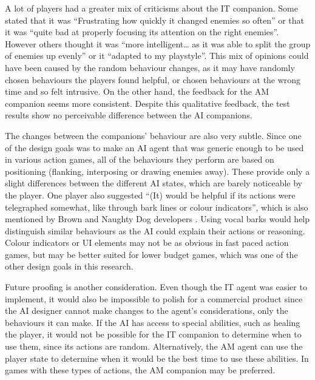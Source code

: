 \documentclass{IEEEtran}
\begin{document}
A lot of players had a greater mix of criticisms about the IT companion. Some stated that it was “Frustrating how quickly it changed enemies so often” or that it was “quite bad at properly focusing its attention on the right enemies”. However others thought it was “more intelligent… as it was able to split the group of enemies up evenly” or it “adapted to my playstyle”. This mix of opinions could have been caused by the random behaviour changes, as it may have randomly chosen behaviours the players found helpful, or chosen behaviours at the wrong time and so felt intrusive. On the other hand, the feedback for the AM companion seems more consistent. Despite this qualitative feedback, the test results show no perceivable difference between the AI companions.


The changes between the companions’ behaviour are also very subtle. Since one of the design goals was to make an AI agent that was generic enough to be used in various action games, all of the behaviours they perform are based on positioning (flanking, interposing or drawing enemies away). These provide only a slight differences between the different AI states, which are barely noticeable by the player. One player also suggested “(It) would be helpful if its actions were telegraphed somewhat, like through bark lines or colour indicators”, which is also mentioned by Brown and Naughty Dog developers \cite{GMTGoodAI, GAIP2EllieAI}. Using vocal barks would help distinguish similar behaviours as the AI could explain their actions or reasoning. Colour indicators or UI elements may not be as obvious in fast paced action games, but may be better suited for lower budget games, which was one of the other design goals in this research.

Future proofing is another consideration. Even though the IT agent was easier to implement, it would also be impossible to polish for a commercial product since the AI designer cannot make changes to the agent’s considerations, only the behaviours it can make. If the AI has access to special abilities, such as healing the player, it would not be possible for the IT companion to determine when to use them, since its actions are random. Alternatively, the AM agent can use the player state to determine when it would be the best time to use these abilities. In games with these types of actions, the AM companion may be preferred.
\end{document}

